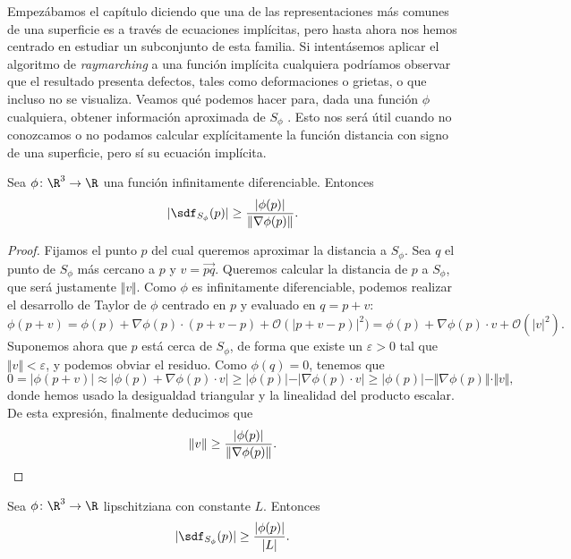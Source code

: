 Empezábamos el capítulo diciendo que una de las representaciones más comunes de una superficie es a través de ecuaciones implícitas, pero hasta ahora nos hemos centrado en estudiar un subconjunto de esta familia. Si intentásemos aplicar el algoritmo de \textit{raymarching} a una función implícita cualquiera podríamos observar que el resultado presenta defectos, tales como deformaciones o grietas, o que incluso no se visualiza. Veamos qué podemos hacer para, dada una función $\phi$ cualquiera, obtener información aproximada de $S_\phi$ \cite{article:aprox}. Esto nos será útil cuando no conozcamos o no podamos calcular explícitamente la función distancia con signo de una superficie, pero sí su ecuación implícita.

\begin{proposicion}
    Sea $\phi\colon \R^3\to\R$ una función infinitamente diferenciable. Entonces
    \begin{equation*}    
        \vert \sdf_{S_\phi}(p)\vert \ge \frac{\vert \phi(p)\vert}{\Vert \nabla\phi(p)\Vert}.
    \end{equation*}
\end{proposicion}
\begin{proof}
    Fijamos el punto $p$ del cual queremos aproximar la distancia a $S_{\phi}$. Sea $q$ el punto de $S_\phi$ más cercano a $p$ y $v=\vec{pq}$. Queremos calcular la distancia de $p$ a $S_\phi$, que será justamente $\Vert v\Vert$. Como $\phi$ es infinitamente diferenciable, podemos realizar el desarrollo de Taylor de $\phi$ centrado en $p$ y evaluado en $q=p+v$:
    \begin{equation*}
        \phi(p+v) = \phi(p) + \nabla\phi(p)\cdot (p+v -p) + \mathcal{O}(\vert p+v-p)\vert^2) = \phi(p) + \nabla\phi(p)\cdot v + \mathcal{O}(\vert v\vert^2).
    \end{equation*}
    Suponemos ahora que $p$ está cerca de $S_\phi$, de forma que existe un $\varepsilon>0$ tal que  $\Vert v\Vert < \varepsilon$, y podemos obviar el residuo. Como $\phi(q)=0$, tenemos que
    \begin{equation*}
        0 = \vert \phi(p+v)\vert \approx \vert \phi(p) + \nabla\phi(p)\cdot v \vert \ge \vert \phi(p)\vert - \vert \nabla\phi(p)\cdot v \vert         \ge \vert \phi(p)\vert - \Vert \nabla\phi(p)\Vert\cdot \Vert v \Vert,
    \end{equation*}
    donde hemos usado la desigualdad triangular y la linealidad del producto escalar. De esta expresión, finalmente deducimos que
    \begin{equation*}
        \Vert v\Vert \ge \frac{\vert \phi(p)\vert}{\Vert \nabla\phi(p)\Vert}.\qedhere
    \end{equation*}
\end{proof}
\begin{corolario}
    Sea $\phi\colon \R^3\to \R$ lipschitziana con constante $L$. Entonces
    \begin{equation*} 
        \vert \sdf_{S_\phi}(p)\vert \ge \frac{\vert \phi(p)\vert}{\vert L\vert}.
    \end{equation*}
\end{corolario}

